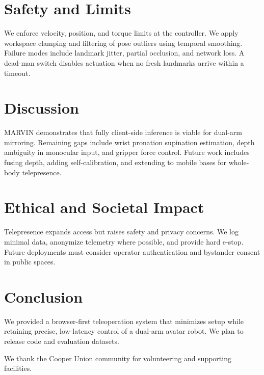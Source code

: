 \documentclass[manuscript,screen]{acmart} %
\begin{document}
\section{Safety and Limits}
We enforce velocity, position, and torque limits at the controller. 
We apply workspace clamping and filtering of pose outliers using 
temporal smoothing. 
Failure modes include landmark jitter, partial occlusion, and network loss. 
A dead-man switch disables actuation when no fresh landmarks arrive 
within a timeout.


\section{Discussion}
MARVIN demonstrates that fully client-side inference is viable for dual-arm mirroring. Remaining gaps include wrist pronation supination estimation, depth ambiguity in monocular input, and gripper force control. Future work includes fusing depth, adding self-calibration, and extending to mobile bases for whole-body telepresence.

\section{Ethical and Societal Impact}
Telepresence expands access but raises safety and privacy concerns. We log minimal data, anonymize telemetry where possible, and provide hard e-stop. Future deployments must consider operator authentication and bystander consent in public spaces.

\section{Conclusion}
We provided a browser-first teleoperation system that minimizes setup while retaining precise, low-latency control of a dual-arm avatar robot. We plan to release code and evaluation datasets.

\begin{acks}
We thank the Cooper Union community for volunteering and supporting facilities.
\end{acks}
\end{document}

